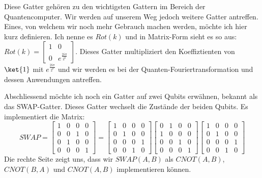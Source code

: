 Diese Gatter gehören zu den wichtigsten Gattern im Bereich der Quantencomputer. Wir werden auf unserem Weg jedoch weitere Gatter antreffen. Eines, von welchem wir noch mehr Gebrauch machen werden, möchte ich hier kurz definieren. Ich nenne es $Rot(k)$ und in Matrix-Form sieht es so aus: $Rot(k) = \begin{bmatrix}1 & 0 \\ 0 & e^{\frac{2i\pi}{2^k}}\end{bmatrix}$. Dieses Gatter multipliziert den Koeffiztienten von $\ket{1}$ mit $e^{\frac{2i\pi}{2^k}}$ und wir werden es bei der Quanten-Fouriertransformation und dessen Anwendungen antreffen.

Abschliessend möchte ich noch ein Gatter auf zwei Qubits erwähnen, bekannt als das SWAP-Gatter. Dieses Gatter wechselt die Zustände der beiden Qubits. Es implementiert die Matrix: $$ SWAP = \begin{bmatrix} 1 & 0 & 0 & 0 \\ 0 & 0 & 1 & 0 \\ 0 & 1 & 0 & 0 \\ 0 & 0 & 0 & 1 \end{bmatrix} = \begin{bmatrix}1 & 0 & 0 & 0 \\ 0 & 1 & 0 & 0 \\ 0 & 0 & 0 & 1 \\ 0 & 0 & 1 & 0\end{bmatrix} \begin{bmatrix}0 & 1 & 0 & 0 \\ 1 & 0 & 0 & 0 \\ 0 & 0 & 1 & 0 \\ 0 & 0 & 0 & 1 \end{bmatrix} \begin{bmatrix}1 & 0 & 0 & 0 \\ 0 & 1 & 0 & 0 \\ 0 & 0 & 0 & 1 \\ 0 & 0 & 1 & 0\end{bmatrix}$$
Die rechte Seite zeigt uns, dass wir $SWAP(A, B)$ als $CNOT(A, B)$, $CNOT(B, A)$ und $CNOT(A, B)$ implementieren können.